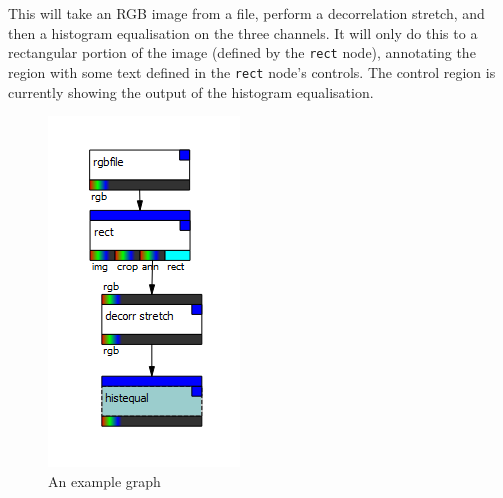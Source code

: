 \clearpage
This will take an RGB image from a file, perform a decorrelation stretch,
and then a histogram equalisation on the three channels. It will
only do this to a rectangular portion of the image (defined by the
\texttt{rect} node), annotating the region with some text defined in
the \texttt{rect} node's controls. The control region is currently
showing the output of the histogram equalisation.

\begin{figure}[ht]
\center
\includegraphics[width=2in]{graph.png}
\caption{An example graph}
\label{graph.png}
\end{figure}


